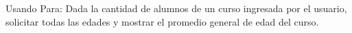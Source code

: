 ﻿
Usando Para: Dada la cantidad de alumnos de un curso ingresada por el usuario, solicitar todas las edades y mostrar el promedio general de edad del curso.


\newpage
{}

\volverindice
\newpage
